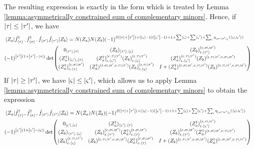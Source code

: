 	The resulting expression is exactly in the form which is treated by Lemma \ref{lemma:asymmetrically constrained sum of complementary minors}. Hence, if $\abs{\tau}\leq\abs{\tau'}$, we have
	\begin{align} \label{eq: general reduced overlap determinant}
	&\mel{Z_a}{\hat{f}\hc_{\seq{\tau}^-}\hat{f}\hc_{\seq{\sigma}^-}\hat{f}_{\seq{\sigma'}}\hat{f}_{\seq{\tau'}}}{Z_b}=N(Z_a)N(Z_b)(-1)^{S(\abs{\tau}+\abs{\tau'})+(\abs{\varsigma}-1)(\abs{\varsigma'}-1)+1+\sum\seq{\varsigma}+\sum\seq{\varsigma'}+\sum_i\eta_{(\sigma\cap\sigma')_i}(\seq{\varsigma\cup\varsigma'})}\nonumber\\
	&(-1)^{\abs{\tau'}(1+\abs{\tau'}-\abs{\tau})}\det(\mqty{
		0_{\abs{\tau'},\abs{\tau}} & (Z_b)_{\seq{\tau'},\seq{\varsigma}} & (Z_b)^{(\text{c.} \sigma\cup\sigma')}_{\text{r.} \seq{\tau'}}\\
		(Z_a\hc)_{\seq{\varsigma'},\seq{\tau}} & (Z_a\hc)^{(\text{c.} \tau\cup\tau')}_{\text{r.} \seq{\varsigma'}}(Z_b)^{(\text{r.} \tau\cup\tau')}_{\text{c.} \seq{\varsigma}} & (Z_a\hc)^{(\text{c.} \tau\cup\tau')}_{\text{r.} \seq{\varsigma'}}(Z_b)^{(\text{r.} \tau\cup\tau', \text{c.} \sigma\cup\sigma')}\\
		(Z_a\hc)^{(\text{r.} \sigma\cup\sigma')}_{\text{c.} \seq{\tau}} & (Z_a\hc)^{(\text{r.} \sigma\cup\sigma', \text{c.} \tau\cup\tau')}(Z_b)^{(\text{r.} \tau\cup\tau')}_{\text{c.} \seq{\varsigma}} & I + (Z_a\hc)^{(\text{r.} \sigma\cup\sigma', \text{c.} \tau\cup\tau')}(Z_b)^{(\text{r.} \tau\cup\tau', \text{c.} \sigma\cup\sigma')}
	})
	\end{align}
	If $\abs{\tau}\geq\abs{\tau'}$, we have $\abs{\varsigma}\leq\abs{\varsigma'}$, which allows us to apply Lemma \ref{lemma:asymmetrically constrained sum of complementary minors} to obtain the expression
	\begin{align} \label{eq: general reduced overlap determinant alt}
	&\mel{Z_a}{\hat{f}\hc_{\seq{\tau}^-}\hat{f}\hc_{\seq{\sigma}^-}\hat{f}_{\seq{\sigma'}}\hat{f}_{\seq{\tau'}}}{Z_b}=N(Z_a)N(Z_b)(-1)^{S(\abs{\tau}+\abs{\tau'})+(\abs{\varsigma}-1)(\abs{\varsigma'}-1)+1+\sum\seq{\varsigma}+\sum\seq{\varsigma'}+\sum_i\eta_{(\sigma\cap\sigma')_i}(\seq{\varsigma\cup\varsigma'})}\nonumber\\
	&(-1)^{\abs{\varsigma'}(1+\abs{\varsigma'}-\abs{\varsigma})}\det(\mqty{
		0_{\abs{\varsigma'},\abs{\varsigma}} & (Z_a\hc)_{\seq{\varsigma'},\seq{\tau}} & (Z_a\hc)^{(\text{c.} \tau\cup\tau')}_{\text{r.} \seq{\varsigma'}}\\		
		(Z_b)_{\seq{\tau'},\seq{\varsigma}} & (Z_b)^{(\text{c.} \sigma\cup\sigma')}_{\text{r.} \seq{\tau'}}(Z_a\hc)^{(\text{r.} \sigma\cup\sigma')}_{\text{c.} \seq{\tau}} & (Z_b)^{(\text{c.} \sigma\cup\sigma')}_{\text{r.} \seq{\tau'}}(Z_a\hc)^{(\text{r.} \sigma\cup\sigma', \text{c.} \tau\cup\tau')}\\	
		(Z_b)^{(\text{r.} \tau\cup\tau')}_{\text{c.} \seq{\varsigma}} & (Z_b)^{(\text{r.} \tau\cup\tau', \text{c.} \sigma\cup\sigma')}(Z_a\hc)^{(\text{r.} \sigma\cup\sigma')}_{\text{c.} \seq{\tau}} & I + (Z_b)^{(\text{r.} \tau\cup\tau', \text{c.} \sigma\cup\sigma')}(Z_a\hc)^{(\text{r.} \sigma\cup\sigma', \text{c.} \tau\cup\tau')}
	})
	\end{align}
